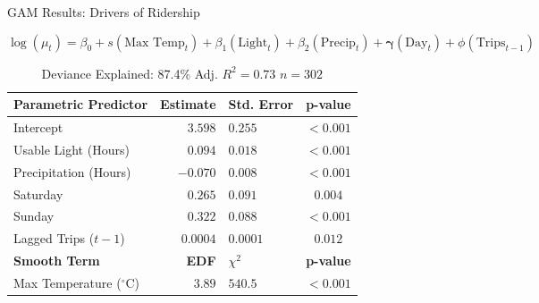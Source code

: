 \documentclass[10pt, aspectratio=169]{beamer}
\begin{document}
\begin{frame}{GAM Results: Drivers of Ridership}
    
    \begin{equation*}
        \log(\mu_t) = \beta_0 + s(\text{Max Temp}_t) + \beta_1(\text{Light}_t) + \beta_2(\text{Precip}_t) + \boldsymbol{\gamma}(\text{Day}_t) + \phi(\text{Trips}_{t-1})
    \end{equation*}
    
    \vspace{0.2cm}
    
    \begin{table}
        \centering
        \small
        \begin{tabular}{lrlc}
            \toprule
            \textbf{Parametric Predictor} & \textbf{Estimate} & \textbf{Std. Error} & \textbf{p-value} \\
            \midrule
            Intercept & $3.598$ & $0.255$ & $<0.001$ \\
            Usable Light (Hours) & $0.094$ & $0.018$ & $<0.001$ \\
            Precipitation (Hours) & $-0.070$ & $0.008$ & $<0.001$ \\
            Saturday & $0.265$ & $0.091$ & $0.004$ \\
            Sunday & $0.322$ & $0.088$ & $<0.001$ \\
            Lagged Trips ($t-1$) & $0.0004$ & $0.0001$ & $0.012$ \\
            \midrule
            \textbf{Smooth Term} & \textbf{EDF} & \textbf{$\chi^2$} & \textbf{p-value} \\
            \midrule
            Max Temperature ($^\circ$C) & $3.89$ & $540.5$ & $<0.001$ \\
            \bottomrule
        \end{tabular}
        \caption*{Deviance Explained: 87.4\% \quad Adj. $R^2 = 0.73$ \quad $n = 302$}
    \end{table}
    
\end{frame}
\end{document}
